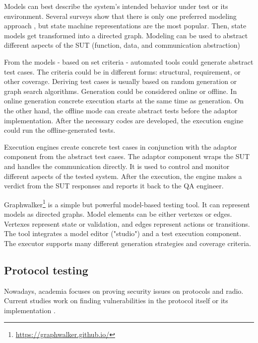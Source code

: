 Models can best describe the system's intended behavior under test or its environment. Several surveys show that there is only one preferred modeling approach \cite{10.1145/1353673.1353681, mbt-survey:2016, mbt-survey:2019}, but state machine representations are the most popular. Then, state models get transformed into a directed graph. Modeling can be used to abstract different aspects of the SUT (function, data, and communication abstraction)

From the models - based on set criteria - automated tools could generate abstract test cases. The criteria could be in different forms: structural, requirement, or other coverage. Deriving test cases is usually based on random generation or graph search algorithms. Generation could be considered online or offline. In online generation concrete execution starts at the same time as generation. On the other hand, the offline mode can create abstract tests before the adaptor implementation. After the necessary codes are developed, the execution engine could run the offline-generated tests.

Execution engines create concrete test cases in conjunction with the adaptor component from the abstract test cases. The adaptor component wraps the SUT and handles the communication directly. It is used to control and monitor different aspects of the tested system. After the execution, the engine makes a verdict from the SUT responses and reports it back to the QA engineer.

Graphwalker\footnote{\url{https://graphwalker.github.io/}} is a simple but powerful model-based testing tool. It can represent models as directed graphs. Model elements can be either vertexes or edges. Vertexes represent state or validation, and edges represent actions or transitions. The tool integrates a model editor ("studio") and a test execution component. The executor supports many different generation strategies and coverage criteria.

\subsection{Protocol testing}
Nowadays, academia focuses on proving security issues on protocols and radio. Current studies work on finding vulnerabilities in the protocol itself or its implementation \cite{10.1145/3576915.3623066, 10.1145/3448300.3468287, 10.1145/3448300.3468296, 10.1145/3548606.3560703, 10.1145/3098243.3098254, 10.1145/3597926.3598144, 10.1145/3507657.3528544}.

